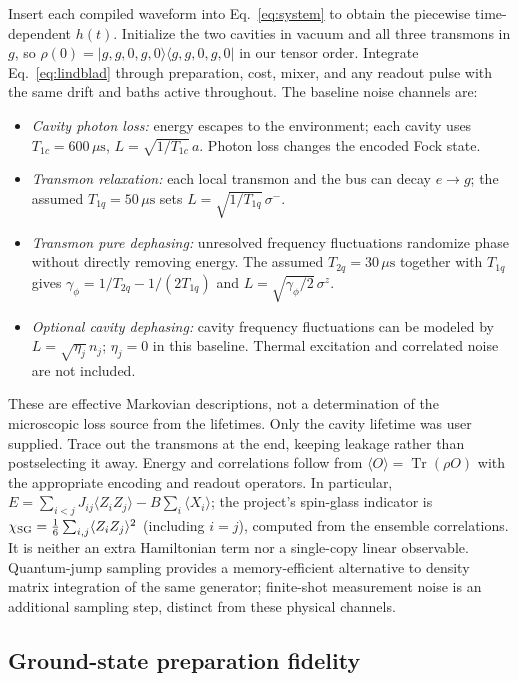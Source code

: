 \documentclass[aps,prb,reprint,amsmath,amssymb,nofootinbib]{revtex4-2}
\newcommand{\ket}[1]{\lvert#1\rangle}
\newcommand{\bra}[1]{\langle#1\rvert}
\newcommand{\tr}{\operatorname{Tr}}
\begin{document}
Insert each compiled waveform into Eq.~\eqref{eq:system} to obtain the
piecewise time-dependent $h(t)$. Initialize the two cavities in vacuum
and all three transmons in $g$, so $\rho(0)=\ket{g,g,0,g,0}
\bra{g,g,0,g,0}$ in our tensor order. Integrate Eq.~\eqref{eq:lindblad}
through preparation, cost, mixer, and any readout pulse with the same
drift and baths active throughout. The baseline noise channels are:
\begin{itemize}
 \item \emph{Cavity photon loss:} energy escapes to the environment;
 each cavity uses $T_{1c}=600\,\mu\mathrm{s}$,
 $L=\sqrt{1/T_{1c}}\,a$. Photon loss changes the encoded Fock state.
 \item \emph{Transmon relaxation:} each local transmon and the bus can
 decay $e\to g$; the assumed $T_{1q}=50\,\mu\mathrm{s}$ sets
 $L=\sqrt{1/T_{1q}}\,\sigma^-$.
 \item \emph{Transmon pure dephasing:} unresolved frequency fluctuations
 randomize phase without directly removing energy. The assumed
 $T_{2q}=30\,\mu\mathrm{s}$ together with $T_{1q}$ gives
 $\gamma_\phi=1/T_{2q}-1/(2T_{1q})$ and
 $L=\sqrt{\gamma_\phi/2}\,\sigma^z$.
 \item \emph{Optional cavity dephasing:} cavity frequency fluctuations
 can be modeled by $L=\sqrt{\eta_j}\,n_j$; $\eta_j=0$ in this baseline.
 Thermal excitation and correlated noise are not included.
\end{itemize}
These are effective Markovian descriptions, not a determination of the
microscopic loss source from the lifetimes. Only the cavity lifetime was
user supplied. Trace out the transmons at the end, keeping leakage
rather than postselecting it away. Energy and correlations follow from
$\langle O\rangle=\tr(\rho O)$ with the appropriate encoding and readout
operators. In particular,
$E=\sum_{i<j}J_{ij}\langle Z_iZ_j\rangle-B\sum_i\langle X_i\rangle$;
the project's spin-glass indicator is
$\chi_{\rm SG}=\frac16\sum_{i,j}\langle Z_iZ_j\rangle^2$
(including $i=j$), computed from the ensemble correlations. It is
neither an extra Hamiltonian term nor a single-copy linear observable.
Quantum-jump sampling provides a memory-efficient alternative to density
matrix integration of the same generator; finite-shot measurement noise
is an additional sampling step, distinct from these physical channels.

\subsection{Ground-state preparation fidelity}
\end{document}
